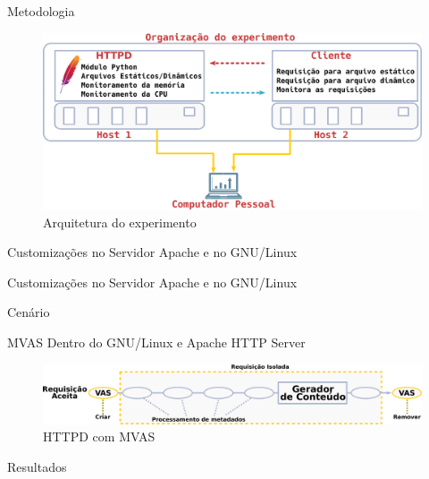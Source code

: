 \documentclass[xcolor={usenames,svgnames,dvipsnames},brazil,english,12pt,aspectratio=149]{beamer}
\begin{document}
\begin{frame}{Metodologia}
  \begin{figure}[!h] \centering
    \includegraphics[width=\textwidth]{experiment_arhitecture}
    \caption*{Arquitetura do experimento}
  \end{figure}
\end{frame}

\begin{frame}{Customizações no Servidor Apache e no GNU/Linux}
  
\end{frame}

\begin{frame}{Customizações no Servidor Apache e no GNU/Linux}
  
\end{frame}

\begin{frame}{Cenário}
  
  
\end{frame}

\begin{frame}{MVAS Dentro do GNU/Linux e Apache HTTP Server}
  \begin{figure}[!h]
    \centering
    \includegraphics[width=\textwidth]{mvas_httpd}
    \caption*{HTTPD com MVAS}
  \end{figure}
\end{frame}

\begin{frame}{Resultados}
  
\end{frame}
\end{document}
